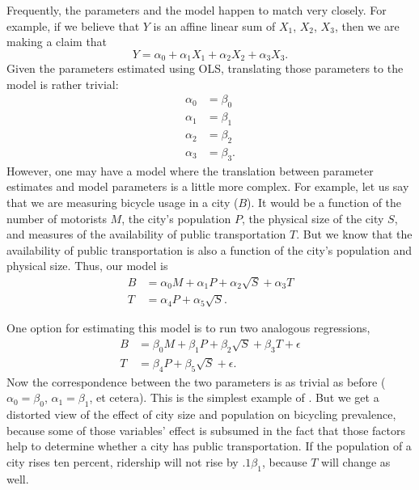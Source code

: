 Frequently, the parameters and the model happen to match very closely.
For example, if we believe that $Y$ is an affine linear sum of $X_1$,
$X_2$, $X_3$, then we are making a claim that 
\begin{equation*}
Y = \alpha_0 + \alpha_1 X_1 + \alpha_2 X_2 + \alpha_3 X_3.
\end{equation*}
Given the parameters estimated using OLS, translating those parameters
to the model is rather trivial:
\begin{align*}
\alpha_0 &= \beta_0\\
\alpha_1 &= \beta_1\\
\alpha_2 &= \beta_2\\
\alpha_3 &= \beta_3.
\end{align*}
However, one may have a model where the translation between parameter estimates and model
parameters is a little more complex.
For example, let us say that we are measuring bicycle usage in a city
($B$).
It would be a function of the number of motorists $M$, the city's
population $P$, the physical size of the city $S$,  and measures of
the availability of public transportation $T$. But we know that the
availability of public transportation is also a function of the city's
population and physical size. Thus, our model is
\begin{align*}
B &= \alpha_0 M + \alpha_1 P + \alpha_2 \sqrt{S} + \alpha_3 T\\
T &= \alpha_4 P + \alpha_5 \sqrt{S}.
\end{align*}

One option for estimating this model is to run two analogous regressions,
\begin{align*}
B &= \beta_0 M + \beta_1 P + \beta_2 \sqrt{S} + \beta_3 T + \epsilon\\
T &= \beta_4 P + \beta_5 \sqrt{S} + \epsilon.
\end{align*}
Now the correspondence between the two parameters is as trivial as
before ($\alpha_0=\beta_0$, $\alpha_1=\beta_1$, et cetera). This is the
simplest example of .
But we get a
distorted view of the effect of city size and population on bicycling
prevalence, because some of those variables' effect is subsumed in the fact that
those factors help to determine whether a city has public
transportation. If the population of a city rises ten percent, ridership
will not rise by $.1 \beta_1$, because $T$ will change as well.

